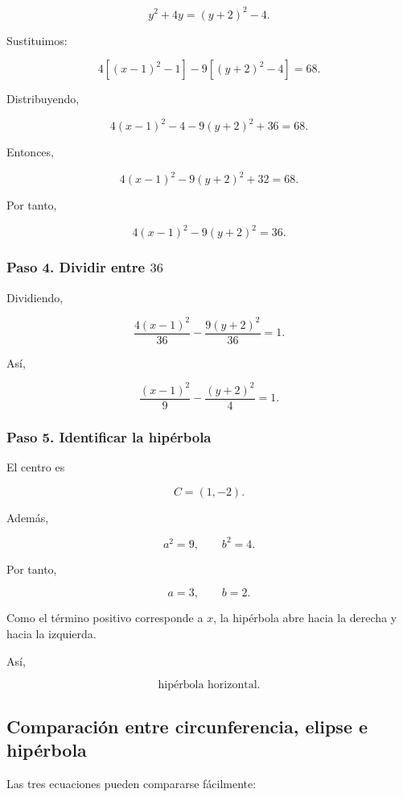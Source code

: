 \documentclass[12pt]{article}
\begin{document}
\[
y^2+4y
=
(y+2)^2-4.
\]

Sustituimos:

\[
4\left[(x-1)^2-1\right]
-
9\left[(y+2)^2-4\right]
=
68.
\]

Distribuyendo,

\[
4(x-1)^2-4
-
9(y+2)^2
+
36
=
68.
\]

Entonces,

\[
4(x-1)^2
-
9(y+2)^2
+
32
=
68.
\]

Por tanto,

\[
4(x-1)^2-9(y+2)^2=36.
\]

\subsubsection*{Paso 4. Dividir entre \(36\)}

Dividiendo,

\[
\frac{4(x-1)^2}{36}
-
\frac{9(y+2)^2}{36}
=
1.
\]

Así,

\[
\boxed{
\frac{(x-1)^2}{9}
-
\frac{(y+2)^2}{4}
=
1.
}
\]

\subsubsection*{Paso 5. Identificar la hipérbola}

El centro es

\[
\boxed{
C=(1,-2).
}
\]

Además,

\[
a^2=9,
\qquad
b^2=4.
\]

Por tanto,

\[
a=3,
\qquad
b=2.
\]

Como el término positivo corresponde a \(x\), la hipérbola abre hacia la
derecha y hacia la izquierda.

Así,

\[
\boxed{
\text{hipérbola horizontal}.
}
\]

\subsection*{Comparación entre circunferencia, elipse e hipérbola}

Las tres ecuaciones pueden compararse fácilmente:
\end{document}
